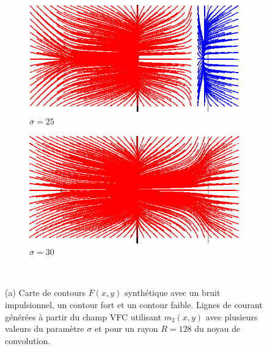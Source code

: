 \begin{figure}[!h]
   \begin{subfigure}[c]{.5\linewidth}
     \centering
     \includegraphics[width=\textwidth]{Chapters/Images/m2_sigma_25.png}
     \caption{$\sigma=25$}
   \end{subfigure}
   \begin{subfigure}[c]{.5\linewidth}
     \centering
     \includegraphics[width=\textwidth]{Chapters/Images/m2_sigma_30.png}
     \caption{$\sigma=30$}
   \end{subfigure}\\
   
   \caption{(a) Carte de contours $F(x,y)$ synthétique avec un bruit impulsionnel, un contour fort et un contour faible. Lignes de courant générées à partir du champ VFC utilisant $m_2(x,y)$ avec plusieurs valeurs du paramètre $\sigma$ et pour un rayon $R=128$ du noyau de convolution.}
   \label{fig:sigma}
\end{figure}